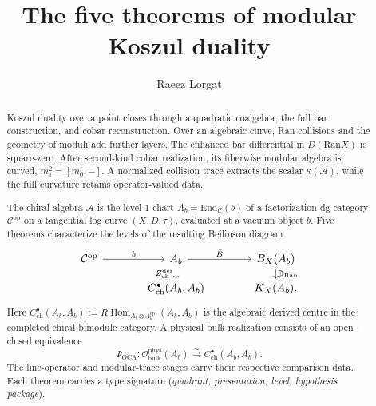 \documentclass[11pt]{article}
\title{The five theorems of modular Koszul duality}
\author{Raeez Lorgat}
\date{}
\theoremstyle{plain}
\theoremstyle{definition}
\theoremstyle{remark}
\newcommand{\Ran}{\mathrm{Ran}}
\newcommand{\cA}{\mathcal{A}}
\begin{document}
\maketitle


\begin{abstract}
Koszul duality over a point closes through a quadratic coalgebra, the
full bar construction, and cobar reconstruction.  Over an algebraic
curve, Ran collisions and the geometry of moduli add further layers.
The enhanced bar differential in $D(\Ran X)$ is square-zero.  After
second-kind cobar realization, its fiberwise modular algebra is curved,
$m_1^2=[m_0,-]$.  A normalized collision trace extracts the scalar
$\kappa(\cA)$, while the full curvature retains operator-valued data.

The chiral algebra $\cA$ is the level-$1$ chart
$A_b = \mathrm{End}_{\mathcal{C}}(b)$ of a factorization
dg-category $\mathcal{C}^{\mathrm{op}}$ on a tangential log
curve $(X, D, \tau)$, evaluated at a vacuum object $b$. Five
theorems characterize the levels of the resulting Beilinson
diagram
\[
\begin{tikzcd}[column sep=large,row sep=small]
 \mathcal C^{\mathrm{op}}
 \arrow[r,"b"]
 & A_b
 \arrow[r,"\bar B"]
 \arrow[d,"Z^{\mathrm{der}}_{\mathrm{ch}}"']
 & B_X(A_b)
 \arrow[d,"\mathbb D_{\Ran}"] \\
 & C^\bullet_{\mathrm{ch}}(A_b,A_b)
 & K_X(A_b).
\end{tikzcd}
\]
Here
\(C^\bullet_{\mathrm{ch}}(A_b,A_b)
:=R\!\operatorname{Hom}_{A_b\otimes A_b^{\mathrm{op}}}(A_b,A_b)\)
is the algebraic derived centre in the completed chiral bimodule
category.  A physical bulk realization consists of an open--closed
equivalence
\[
 \Psi_{\mathrm{OCA}}\colon
 \mathcal O^{\mathrm{phys}}_{\mathrm{bulk}}(A_b)
 \xrightarrow{\ \sim\ }C^\bullet_{\mathrm{ch}}(A_b,A_b).
\]
The line-operator and modular-trace stages carry their respective
comparison data.
Each theorem carries a type signature
(\emph{quadrant, presentation, level, hypothesis package}).


\end{abstract}
\end{document}
